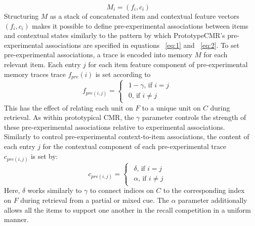 {}\begin{equation} \label{eq:16} M_i = (f_i, c_i) \end{equation}\markdownRendererInterblockSeparator
{}\markdownRendererInterblockSeparator
{}Structuring $M$ as a stack of concatenated item and contextual feature vectors $(f_i, c_i)$ makes it possible to define pre-experimental associations between items and contextual states similarly to the pattern by which PrototypeCMR's pre-experimental associations are specified in equations ~\ref{eq:1} and ~\ref{eq:2}. To set pre-experimental associations, a trace is encoded into memory $M$ for each relevant item. Each entry $j$ for each item feature component of pre-experimental memory traces trace $f_{pre}(i)$ is set according to\markdownRendererInterblockSeparator
{}\begin{equation} \label{eq:17} f_{pre(i, j)} = \begin{cases} \begin{alignedat}{2} 1 - \gamma \text{, if } i=j \\ 0 \text{, if } i \neq j \end{alignedat} \end{cases} \end{equation}\markdownRendererInterblockSeparator
{}This has the effect of relating each unit on $F$ to a unique unit on $C$ during retrieval. As within prototypical CMR, the $\gamma$ parameter controls the strength of these pre-experimental associations relative to experimental associations.\markdownRendererInterblockSeparator
{}Similarly to control pre-experimental context-to-item associations, the content of each entry $j$ for the contextual component of each pre-experimental trace $c_{pre(i,j)}$ is set by:\markdownRendererInterblockSeparator
{}\begin{equation} \label{eq:18} c_{pre(i,j)} = \begin{cases} \begin{alignedat}{2} \delta \text{, if } i=j \\ \alpha \text{, if } i \neq j \end{alignedat} \end{cases} \end{equation}\markdownRendererInterblockSeparator
{}Here, $\delta$ works similarly to $\gamma$ to connect indices on $C$ to the corresponding index on $F$ during retrieval from a partial or mixed cue. The $\alpha$ parameter additionally allows all the items to support one another in the recall competition in a uniform manner.\markdownRendererInterblockSeparator
